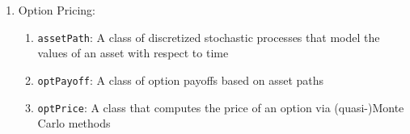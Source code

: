 \begin{enumerate} [label=\Roman*.]
\item Option Pricing:
\begin{enumerate}\setlength\itemsep{1em}
\item \texttt{assetPath}: A class of discretized stochastic processes that model the values of an asset with respect to time \cite{ChoEtal18b}
\item \texttt{optPayoff}: A class of option payoffs based on asset paths \cite{ChoEtal18b}
\item \texttt{optPrice}: A class that computes the price of an option via (quasi-)Monte Carlo methods \cite{ChoEtal18b}
\end{enumerate}

\end{enumerate}


 